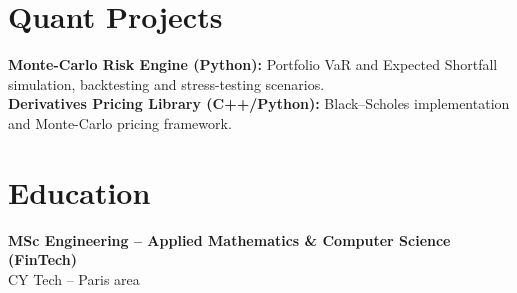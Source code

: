 \documentclass[10pt, letterpaper]{article}
\begin{document}
\section*{Quant Projects}
\textbf{Monte-Carlo Risk Engine (Python):} Portfolio VaR and Expected Shortfall simulation, backtesting and stress-testing scenarios.\\
\textbf{Derivatives Pricing Library (C++/Python):} Black--Scholes implementation and Monte-Carlo pricing framework.

\section*{Education}
\textbf{MSc Engineering -- Applied Mathematics \& Computer Science (FinTech)}\\
CY Tech -- Paris area
\end{document}
